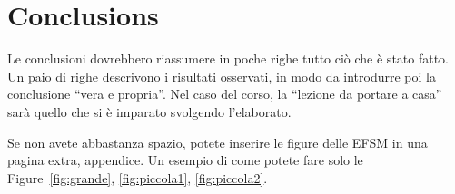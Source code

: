 \documentclass[12pt]{IEEEtran}
\begin{document}
\section{Conclusions}
Le conclusioni dovrebbero riassumere in poche righe  tutto ci\`o che \`e stato fatto. Un paio di righe descrivono i risultati osservati, in modo da introdurre poi la conclusione ``vera e propria''. Nel caso del corso, la ``lezione da portare a casa'' sar\`a quello che si \`e imparato svolgendo l'elaborato.





\appendix
Se non avete abbastanza spazio, potete inserire le figure delle EFSM in una  pagina extra, appendice. Un esempio di come potete fare solo le Figure~\ref{fig:grande}, \ref{fig:piccola1}, \ref{fig:piccola2}.
\end{document}
